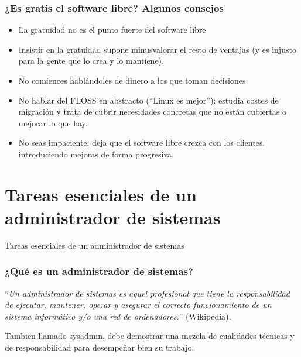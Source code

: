 \documentclass{beamer}
\begin{document}

\begin{frame}
\frametitle{¿Es gratis el software libre? Algunos consejos}

\pause

\begin{itemize}
\item La gratuidad no es el punto fuerte del software libre
\item Insistir en la gratuidad supone minusvalorar el resto de ventajas (y es injusto para la gente que lo crea y lo mantiene).
\item No comiences hablándoles de dinero a los que toman decisiones. 
\item No hablar del FLOSS en abstracto (``Linux es mejor''): estudia costes de migración y trata de cubrir necesidades concretas que no están cubiertas o mejorar lo que hay.
\item No seas impaciente: deja que el software libre crezca con los clientes, introduciendo mejoras de forma progresiva.
\end{itemize}
\end{frame}



\section{Tareas esenciales de un administrador de sistemas}

\begin{frame}

\begin{center}
\huge{Tareas esenciales de un administrador de sistemas}
\end{center}

\end{frame}



\begin{frame}
\frametitle{¿Qué es un administrador de sistemas?}

``\textit{Un administrador de sistemas es aquel profesional que tiene la responsabilidad de ejecutar, mantener, operar y asegurar el correcto funcionamiento de un sistema informático y/o una red de ordenadores.}'' (Wikipedia).

\bigskip

Tambien llamado \alert{sysadmin}, debe demostrar una mezcla de \alert{cualidades técnicas} y de \alert{responsabilidad} para desempeñar bien su trabajo. 

\end{frame}
\end{document}
